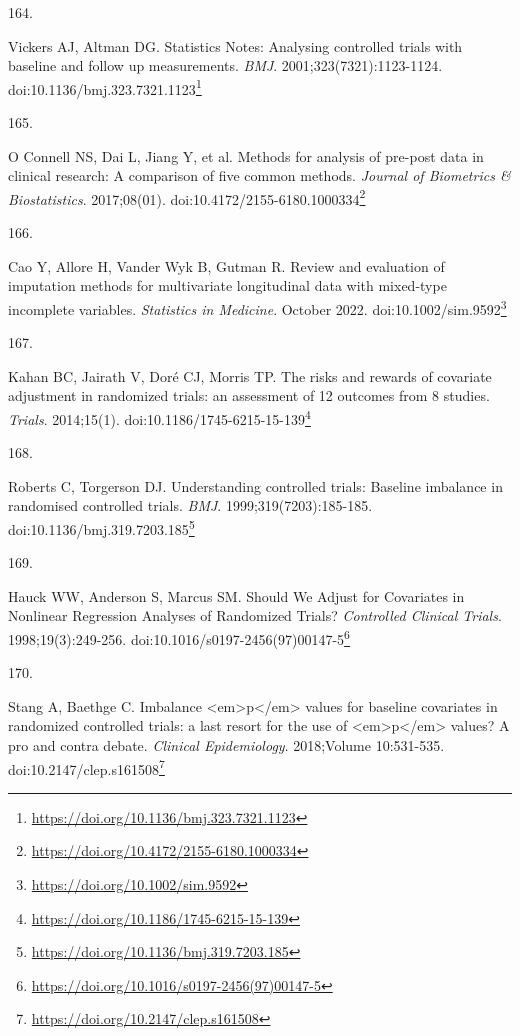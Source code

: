 \documentclass[
  a4paper,
]{book}
\newlength{\cslhangindent}
\newlength{\csllabelwidth}
\newlength{\cslentryspacingunit} %
\newenvironment{CSLReferences}[2] %
 {%
  \setlength{\parindent}{0pt}
  \ifodd #1
  \let\oldpar\par
  \def\par{\hangindent=\cslhangindent\oldpar}
  \fi
  \setlength{\parskip}{#2\cslentryspacingunit}
 }%
 {}
\newcommand{\CSLLeftMargin}[1]{\parbox[t]{\csllabelwidth}{#1}}
\newcommand{\CSLRightInline}[1]{\parbox[t]{\linewidth - \csllabelwidth}{#1}\break}
\renewcommand{\href}[2]{#2\footnote{\url{#1}}}
\begin{document}
\begin{CSLReferences}{0}{0}
\leavevmode{}%
\CSLLeftMargin{164. }%
\CSLRightInline{Vickers AJ, Altman DG. Statistics Notes: Analysing controlled trials with baseline and follow up measurements. \emph{BMJ}. 2001;323(7321):1123-1124. doi:\href{https://doi.org/10.1136/bmj.323.7321.1123}{10.1136/bmj.323.7321.1123}}

\leavevmode{}%
\CSLLeftMargin{165. }%
\CSLRightInline{O Connell NS, Dai L, Jiang Y, et al. Methods for analysis of pre-post data in clinical research: A comparison of five common methods. \emph{Journal of Biometrics \& Biostatistics}. 2017;08(01). doi:\href{https://doi.org/10.4172/2155-6180.1000334}{10.4172/2155-6180.1000334}}

\leavevmode{}%
\CSLLeftMargin{166. }%
\CSLRightInline{Cao Y, Allore H, Vander Wyk B, Gutman R. Review and evaluation of imputation methods for multivariate longitudinal data with mixed{-}type incomplete variables. \emph{Statistics in Medicine}. October 2022. doi:\href{https://doi.org/10.1002/sim.9592}{10.1002/sim.9592}}

\leavevmode{}%
\CSLLeftMargin{167. }%
\CSLRightInline{Kahan BC, Jairath V, Doré CJ, Morris TP. The risks and rewards of covariate adjustment in randomized trials: an assessment of 12 outcomes from 8 studies. \emph{Trials}. 2014;15(1). doi:\href{https://doi.org/10.1186/1745-6215-15-139}{10.1186/1745-6215-15-139}}

\leavevmode{}%
\CSLLeftMargin{168. }%
\CSLRightInline{Roberts C, Torgerson DJ. Understanding controlled trials: Baseline imbalance in randomised controlled trials. \emph{BMJ}. 1999;319(7203):185-185. doi:\href{https://doi.org/10.1136/bmj.319.7203.185}{10.1136/bmj.319.7203.185}}

\leavevmode{}%
\CSLLeftMargin{169. }%
\CSLRightInline{Hauck WW, Anderson S, Marcus SM. Should We Adjust for Covariates in Nonlinear Regression Analyses of Randomized Trials? \emph{Controlled Clinical Trials}. 1998;19(3):249-256. doi:\href{https://doi.org/10.1016/s0197-2456(97)00147-5}{10.1016/s0197-2456(97)00147-5}}

\leavevmode{}%
\CSLLeftMargin{170. }%
\CSLRightInline{Stang A, Baethge C. Imbalance \textless em\textgreater p\textless/em\textgreater{} values for baseline covariates in randomized controlled trials: a last resort for the use of \textless em\textgreater p\textless/em\textgreater{} values? A pro and contra debate. \emph{Clinical Epidemiology}. 2018;Volume 10:531-535. doi:\href{https://doi.org/10.2147/clep.s161508}{10.2147/clep.s161508}}


\end{CSLReferences}
\end{document}
